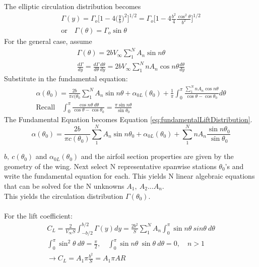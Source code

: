 \documentclass[draft=false, titlepage]{article}
\begin{document}
The elliptic circulation distribution becomes
\begin{gather*}
    \Gamma(y) = \Gamma_o \Big[ 1-4\big(\frac{y}{b}\big)^2 \Big] ^{1/2} = \Gamma_o \Big[ 1-4\frac{b^2}{4}\frac{\cos^2\theta}{b^2} \Big]^{1/2}\\
    \text{or}\quad \Gamma(\theta) = \Gamma_o \sin\theta
\end{gather*}
For the general case, assume
\begin{gather*}
    \Gamma(\theta) = 2bV_\infty \sum_1^N A_n\sin n\theta\\
    \frac{d\Gamma}{dy} = \frac{d\Gamma}{d\theta}\frac{d\theta}{dy} = 2bV_\infty \sum_1^N n A_n \cos n\theta \frac{d\theta}{dy}
\end{gather*}
Substitute in the fundamental equation:
\begin{gather*}
    \alpha(\theta_0) = \frac{2b}{\pi c(\theta_0} \sum_1^N A_n \sin n\theta + \alpha_{0L} (\theta_0) + \frac{1}{\pi} \int_0^\pi \frac{\sum_1^N n A_n \cos n\theta}{\cos\theta - \cos\theta_0} d\theta\\
    \text{Recall}\quad \int_0^\pi \frac{\cos n\theta\ d\theta}{\cos\theta - \cos\theta_0} = \frac{\pi \sin n\theta}{\sin\theta_0}
\end{gather*}
The Fundamental Equation becomes Equation \ref{eq:fundamentalLiftDistribution}.
\begin{equation}
    \alpha(\theta_0) = \frac{2b}{\pi c(\theta_0)} \sum_1^N A_n \sin n\theta_0 + \alpha_{0L}(\theta_0) + \sum_1^N n A_n \frac{\sin n\theta_0}{\sin\theta_0}
    \label{eq:fundamentalLiftDistribution}
\end{equation}

$b,\ c(\theta_0)$ and $\alpha_{0L}(\theta_0)$ and the airfoil section properties are given by the geometry of the wing. Next select N representative spanwise stations $\theta_0$'s and write the fundamental equation for each. This yields N linear algebraic equations that can be solved for the N unknowns $A_1,\ A_2...A_n$.\\
This yields the circulation distribution $\Gamma(\theta_0)$.
\paragraph*{} For the lift coefficient:
\begin{gather*}
    C_L = \frac{2}{V_\infty S} \int_{-b/2}^{b/2} \Gamma(y)dy = \frac{2b^2}{S} \sum_1^N A_n \int_0^\pi \sin n\theta\ sin\theta\ d\theta\\
    \int_0^\pi \sin^2\theta\ d\theta = \frac{\pi}{2},\quad \int_0^\pi \sin n\theta\ \sin\theta\ d\theta = 0,\quad n>1\\
    \rightarrow C_L = A_1 \pi \frac{b^2}{S} = A_1 \pi AR
\end{gather*}
\end{document}
